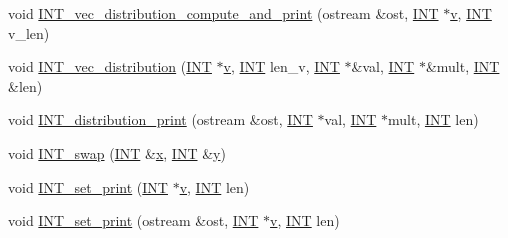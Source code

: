 \begin{DoxyCompactItemize}
\item 
void \mbox{\hyperlink{util_8_c_a2b19a430ec12f29fe3527ab5776f0a1b}{I\+N\+T\+\_\+vec\+\_\+distribution\+\_\+compute\+\_\+and\+\_\+print}} (ostream \&ost, \mbox{\hyperlink{galois_8h_a09fddde158a3a20bd2dcadb609de11dc}{I\+NT}} $\ast$\mbox{\hyperlink{simeon_8_c_aeb3f3030944801b163bc3b829a7f6710}{v}}, \mbox{\hyperlink{galois_8h_a09fddde158a3a20bd2dcadb609de11dc}{I\+NT}} v\+\_\+len)
\item 
void \mbox{\hyperlink{util_8_c_a58ea1abe1be41946425b30ebb8e3e2bc}{I\+N\+T\+\_\+vec\+\_\+distribution}} (\mbox{\hyperlink{galois_8h_a09fddde158a3a20bd2dcadb609de11dc}{I\+NT}} $\ast$\mbox{\hyperlink{simeon_8_c_aeb3f3030944801b163bc3b829a7f6710}{v}}, \mbox{\hyperlink{galois_8h_a09fddde158a3a20bd2dcadb609de11dc}{I\+NT}} len\+\_\+v, \mbox{\hyperlink{galois_8h_a09fddde158a3a20bd2dcadb609de11dc}{I\+NT}} $\ast$\&val, \mbox{\hyperlink{galois_8h_a09fddde158a3a20bd2dcadb609de11dc}{I\+NT}} $\ast$\&mult, \mbox{\hyperlink{galois_8h_a09fddde158a3a20bd2dcadb609de11dc}{I\+NT}} \&len)
\item 
void \mbox{\hyperlink{util_8_c_a7f3a8c4610142655e2db7ec78534e14f}{I\+N\+T\+\_\+distribution\+\_\+print}} (ostream \&ost, \mbox{\hyperlink{galois_8h_a09fddde158a3a20bd2dcadb609de11dc}{I\+NT}} $\ast$val, \mbox{\hyperlink{galois_8h_a09fddde158a3a20bd2dcadb609de11dc}{I\+NT}} $\ast$mult, \mbox{\hyperlink{galois_8h_a09fddde158a3a20bd2dcadb609de11dc}{I\+NT}} len)
\item 
void \mbox{\hyperlink{util_8_c_a2ffd557a40a6f134ebd1031a586d364d}{I\+N\+T\+\_\+swap}} (\mbox{\hyperlink{galois_8h_a09fddde158a3a20bd2dcadb609de11dc}{I\+NT}} \&\mbox{\hyperlink{alphabet2_8_c_a6150e0515f7202e2fb518f7206ed97dc}{x}}, \mbox{\hyperlink{galois_8h_a09fddde158a3a20bd2dcadb609de11dc}{I\+NT}} \&\mbox{\hyperlink{alphabet2_8_c_a0a2f84ed7838f07779ae24c5a9086d33}{y}})
\item 
void \mbox{\hyperlink{util_8_c_a97614645ec11df30e0e896367f91ffd9}{I\+N\+T\+\_\+set\+\_\+print}} (\mbox{\hyperlink{galois_8h_a09fddde158a3a20bd2dcadb609de11dc}{I\+NT}} $\ast$\mbox{\hyperlink{simeon_8_c_aeb3f3030944801b163bc3b829a7f6710}{v}}, \mbox{\hyperlink{galois_8h_a09fddde158a3a20bd2dcadb609de11dc}{I\+NT}} len)
\item 
void \mbox{\hyperlink{util_8_c_a424a19268f9498b8cc0c30fc9cf18b05}{I\+N\+T\+\_\+set\+\_\+print}} (ostream \&ost, \mbox{\hyperlink{galois_8h_a09fddde158a3a20bd2dcadb609de11dc}{I\+NT}} $\ast$\mbox{\hyperlink{simeon_8_c_aeb3f3030944801b163bc3b829a7f6710}{v}}, \mbox{\hyperlink{galois_8h_a09fddde158a3a20bd2dcadb609de11dc}{I\+NT}} len)

\end{DoxyCompactItemize}

